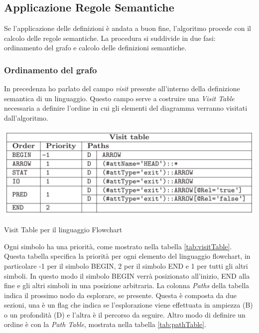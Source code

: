         \subsection{Applicazione Regole Semantiche}
            Se l'applicazione delle definizioni è andata a buon fine, l'algoritmo procede con il calcolo delle regole semantiche. La procedura si suddivide in due fasi: ordinamento del grafo e calcolo delle definizioni semantiche.

            \subsubsection{Ordinamento del grafo}
                In precedenza ho parlato del campo \textit{visit} presente all'interno della definizione semantica di un linguaggio. Questo campo serve a costruire una \textit{Visit Table} necessaria a definire l'ordine in cui gli elementi del diagramma verranno visitati dall'algoritmo.

                \begin{table}[htbp]
                    \centering
                    \includegraphics[scale=0.6]{Figure/visitTable.PNG}
                    \caption{Visit Table per il linguaggio Flowchart}
                    \label{tab:visitTable}
                \end{table}

                Ogni simbolo ha una priorità, come mostrato nella tabella \ref{tab:visitTable}. Questa tabella specifica la priorità per ogni elemento del linguaggio flowchart, in particolare -1 per il simbolo BEGIN, 2 per il simbolo END e 1 per tutti gli altri simboli. In questo modo il simbolo BEGIN verrà posizionato all'inizio, END alla fine e gli altri simboli in una posizione arbitraria. 
                \newline
                La colonna \textit{Paths} della tabella indica il prossimo nodo da esplorare, se presente. Questa è composta da due sezioni, una è un flag che indica se l'esplorazione viene effettuata in ampiezza (B) o un profondità (D) e l'altra è il percorso da seguire.
                \newline
                Altro modo di definire un ordine è con la \textit{Path Table}, mostrata nella tabella \ref{tab:pathTable}. 

